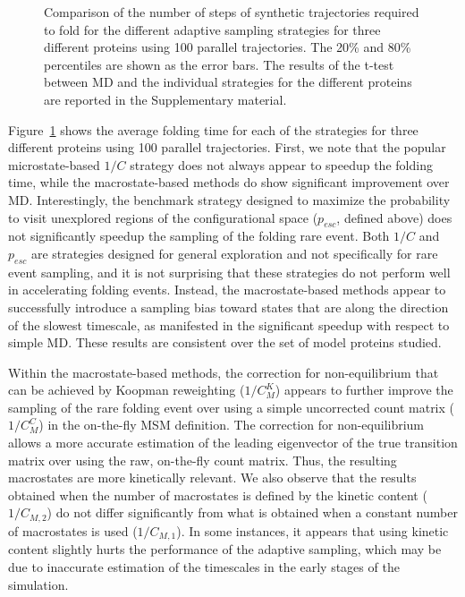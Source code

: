 \begin{figure}[H]
\begin{subfigure}[t]{0.5\textwidth}
  \end{subfigure}
  \caption{Comparison of the number of steps of synthetic trajectories required
  to fold for the different adaptive sampling strategies for three different
  proteins using 100 parallel trajectories. The 20\% and 80\% percentiles are
  shown as the error bars. The results of the t-test between MD and the
  individual strategies for the different proteins are reported in the Supplementary material.}
  \label{fig:Time_fold}
\end{figure}

Figure~\ref{fig:Time_fold} shows the average folding time for each of the
strategies for three different proteins using 100 parallel trajectories. First, we note that the
popular microstate-based $1/C$ strategy does not always appear to speedup the
folding time, while the macrostate-based methods do show significant
improvement over MD. 
Interestingly, the benchmark strategy designed to maximize the probability to
visit unexplored regions of the configurational space  ($p_{esc}$, defined
above) does not significantly speedup the sampling of the folding rare event.
Both $1/C$ and $p_{esc}$ are strategies designed for general exploration and
not specifically for rare event sampling, and it is not surprising that these
strategies do not perform well in accelerating folding events.
Instead, the macrostate-based methods appear to successfully introduce a
sampling bias toward states that are along the direction of the slowest
timescale, as manifested in the significant speedup with respect to simple MD.
These results are consistent over the set of model proteins studied.

Within the macrostate-based methods, the correction for non-equilibrium that
can be achieved by Koopman reweighting ($1/C_M^K$) appears to further improve
the sampling of the rare folding event over using a simple uncorrected count
matrix ($1/C_M^C$) in the on-the-fly MSM definition. The correction for
non-equilibrium allows a more accurate estimation of the leading eigenvector of
the true transition matrix over using the raw, on-the-fly count matrix. Thus,
the resulting macrostates are more kinetically relevant. We also observe that
the results obtained when the number of macrostates is defined by the kinetic
content ($1/C_{M, 2}$) do not differ significantly from what is obtained when a constant number
of macrostates is used ($1/C_{M, 1}$). In some instances, it appears that using
kinetic content slightly hurts the performance of the adaptive sampling, which
may be due to inaccurate estimation of the timescales in the early stages
of the simulation.

